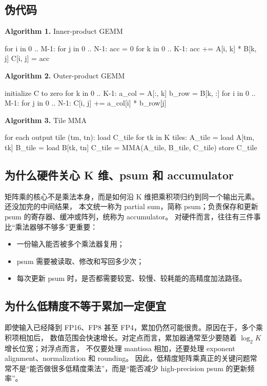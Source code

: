 \documentclass[UTF8,11pt,a4paper]{ctexart}
\begin{document}
\subsection{伪代码}

\noindent\textbf{Algorithm 1.} Inner-product GEMM
\begin{code}
for i in 0 .. M-1:
  for j in 0 .. N-1:
    acc = 0
    for k in 0 .. K-1:
      acc += A[i, k] * B[k, j]
    C[i, j] = acc
\end{code}

\noindent\textbf{Algorithm 2.} Outer-product GEMM
\begin{code}
initialize C to zero
for k in 0 .. K-1:
  a_col = A[:, k]
  b_row = B[k, :]
  for i in 0 .. M-1:
    for j in 0 .. N-1:
      C[i, j] += a_col[i] * b_row[j]
\end{code}

\noindent\textbf{Algorithm 3.} Tile MMA
\begin{code}
for each output tile (tm, tn):
  load C_tile
  for tk in K tiles:
    A_tile = load A[tm, tk]
    B_tile = load B[tk, tn]
    C_tile = MMA(A_tile, B_tile, C_tile)
  store C_tile
\end{code}

\subsection{为什么硬件关心 K 维、psum 和 accumulator}

矩阵乘的核心不是乘法本身，而是如何沿 K 维把乘积项归约到同一个输出元素。还没加完的中间结果，
本文统一称为 partial sum，简称 psum；负责保存和更新 psum 的寄存器、缓冲或阵列，统称为 accumulator。
对硬件而言，往往有三件事比“乘法器够不够多”更重要：

\begin{itemize}
  \item 一份输入能否被多个乘法器复用；
  \item psum 需要被读取、修改和写回多少次；
  \item 每次更新 psum 时，是否都需要较宽、较慢、较耗能的高精度加法路径。
\end{itemize}

\subsection{为什么低精度不等于累加一定便宜}

即使输入已经降到 FP16、FP8 甚至 FP4，累加仍然可能很贵。原因在于，多个乘积项相加后，
数值范围会快速增长。对定点而言，累加器通常至少要随着 $\log_2 K$ 增长位宽；对浮点而言，
不仅要处理 mantissa 相加，还要处理 exponent alignment、normalization 和 rounding。
因此，低精度矩阵乘真正的关键问题常常不是“能否做很多低精度乘法”，而是“能否减少 high-precision
psum 的更新频率”。
\end{document}
